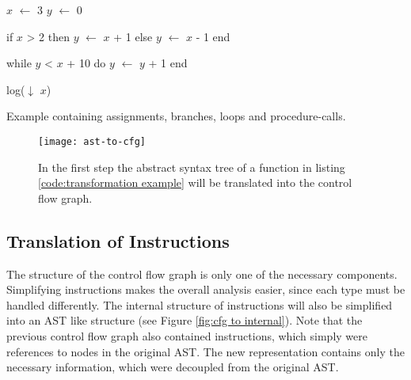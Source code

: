 \begin{program}[h!]
	\begin{GenericCode}
		$x$ $\leftarrow$ 3
		$y$ $\leftarrow$ 0
		
		if $x$ > 2 then
			$y$ $\leftarrow$ $x$ + 1
		else
			$y$ $\leftarrow$ $x$ - 1
		end
		
		while $y$ < $x$ + 10 do
			$y$ $\leftarrow$ $y$ + 1
		end
		
		log($\downarrow$ $x$)\end{GenericCode}
	\caption{Example containing assignments, branches, loops and procedure-calls. }
	\label{code:transformation example}
\end{program}

\begin{figure}[h!]
	\centering
	\texttt{[image: ast-to-cfg]}
	\caption{In the first step the abstract syntax tree of a function in listing \ref{code:transformation example} will be translated into the control flow graph.}
	\label{fig:ast to cfg}
\end{figure}


\subsection{Translation of Instructions}
\label{subsec:translate instructions}
The structure of the control flow graph is only one of the necessary components. 
Simplifying instructions makes the overall analysis easier, since each type must be handled differently.
The internal structure of instructions will also be simplified into an AST like structure (see Figure \ref{fig:cfg to internal}). 
Note that the previous control flow graph also contained instructions, which simply were references to nodes in the original AST. 
The new representation contains only the necessary information, which were decoupled from the original AST.


